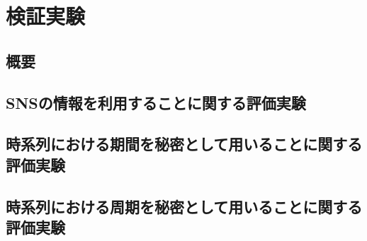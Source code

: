 \chapter{検証実験}\label{chap:experiment}

\section{概要}

\section{SNSの情報を利用することに関する評価実験}
\section{時系列における期間を秘密として用いることに関する評価実験}
\section{時系列における周期を秘密として用いることに関する評価実験}



\newpage

